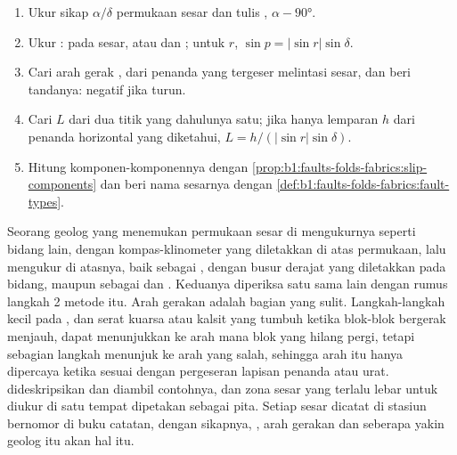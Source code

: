 \begin{method}\label{met:b1:faults-folds-fabrics:slip}
\begin{enumerate}
  \item Ukur sikap $\alpha/\delta$ permukaan sesar dan tulis , $\alpha - \ang{90}$.
  \item Ukur :  pada sesar, atau  dan ; untuk  $r$, $\sin p = |\sin r|\sin\delta$.
  \item Cari arah gerak , dari penanda yang tergeser melintasi sesar, dan beri  tandanya: negatif jika  turun.
  \item Cari  $L$ dari dua titik yang dahulunya satu; jika hanya lemparan $h$ dari penanda horizontal yang diketahui, $L = h/(|\sin r|\sin\delta)$.
  \item Hitung komponen-komponennya dengan \cref{prop:b1:faults-folds-fabrics:slip-components} dan beri nama sesarnya dengan \cref{def:b1:faults-folds-fabrics:fault-types}.
\end{enumerate}
\end{method}

\begin{inthefield}
Seorang geolog yang menemukan permukaan sesar di  mengukurnya seperti bidang lain, dengan kompas-klinometer yang diletakkan di atas permukaan, lalu mengukur  di atasnya, baik sebagai , dengan busur derajat yang diletakkan pada bidang, maupun sebagai  dan . Keduanya diperiksa satu sama lain dengan rumus langkah 2 metode itu. Arah gerakan adalah bagian yang sulit. Langkah-langkah kecil pada , dan serat kuarsa atau kalsit yang tumbuh ketika blok-blok bergerak menjauh, dapat menunjukkan ke arah mana blok yang hilang pergi, tetapi sebagian langkah menunjuk ke arah yang salah, sehingga arah itu hanya dipercaya ketika sesuai dengan pergeseran lapisan penanda atau urat.  dideskripsikan dan diambil contohnya, dan zona sesar yang terlalu lebar untuk diukur di satu tempat dipetakan sebagai pita. Setiap sesar dicatat di stasiun bernomor di buku catatan, dengan sikapnya, , arah gerakan dan seberapa yakin geolog itu akan hal itu.
\end{inthefield}

